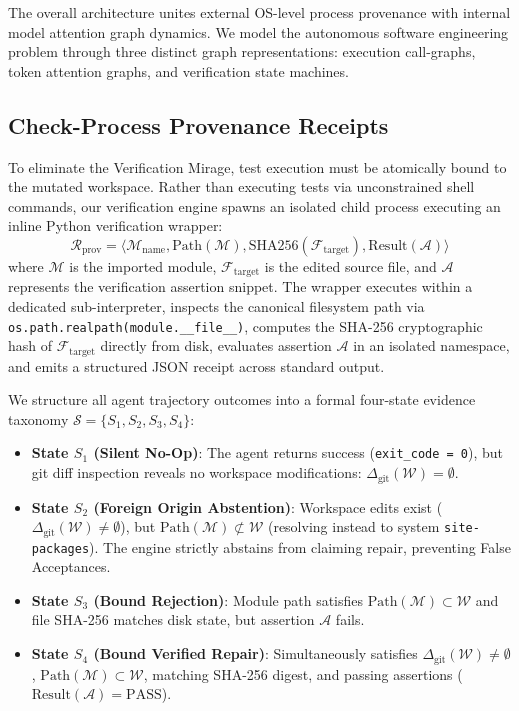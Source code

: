 \documentclass[10pt,twocolumn]{article}
\begin{document}
The overall architecture unites external OS-level process provenance with internal model attention graph dynamics. We model the autonomous software engineering problem through three distinct graph representations: execution call-graphs, token attention graphs, and verification state machines.

\subsection{Check-Process Provenance Receipts}
To eliminate the Verification Mirage, test execution must be atomically bound to the mutated workspace. Rather than executing tests via unconstrained shell commands, our verification engine spawns an isolated child process executing an inline Python verification wrapper:
\begin{equation}
    \mathcal{R}_{\text{prov}} = \big\langle \mathcal{M}_{\text{name}}, \text{Path}(\mathcal{M}), \text{SHA256}(\mathcal{F}_{\text{target}}), \text{Result}(\mathcal{A}) \big\rangle
\end{equation}
where $\mathcal{M}$ is the imported module, $\mathcal{F}_{\text{target}}$ is the edited source file, and $\mathcal{A}$ represents the verification assertion snippet. The wrapper executes within a dedicated sub-interpreter, inspects the canonical filesystem path via \texttt{os.path.realpath(module.\_\_file\_\_)}, computes the SHA-256 cryptographic hash of $\mathcal{F}_{\text{target}}$ directly from disk, evaluates assertion $\mathcal{A}$ in an isolated namespace, and emits a structured JSON receipt across standard output.

We structure all agent trajectory outcomes into a formal four-state evidence taxonomy $\mathcal{S} = \{S_1, S_2, S_3, S_4\}$:
\begin{itemize}
    \item \textbf{State $S_1$ (Silent No-Op)}: The agent returns success (\texttt{exit\_code = 0}), but git diff inspection reveals no workspace modifications: $\Delta_{\text{git}}(\mathcal{W}) = \emptyset$.
    \item \textbf{State $S_2$ (Foreign Origin Abstention)}: Workspace edits exist ($\Delta_{\text{git}}(\mathcal{W}) \neq \emptyset$), but $\text{Path}(\mathcal{M}) \not\subset \mathcal{W}$ (resolving instead to system \texttt{site-packages}). The engine strictly abstains from claiming repair, preventing False Acceptances.
    \item \textbf{State $S_3$ (Bound Rejection)}: Module path satisfies $\text{Path}(\mathcal{M}) \subset \mathcal{W}$ and file SHA-256 matches disk state, but assertion $\mathcal{A}$ fails.
    \item \textbf{State $S_4$ (Bound Verified Repair)}: Simultaneously satisfies $\Delta_{\text{git}}(\mathcal{W}) \neq \emptyset$, $\text{Path}(\mathcal{M}) \subset \mathcal{W}$, matching SHA-256 digest, and passing assertions ($\text{Result}(\mathcal{A}) = \text{PASS}$).
\end{itemize}
\end{document}
